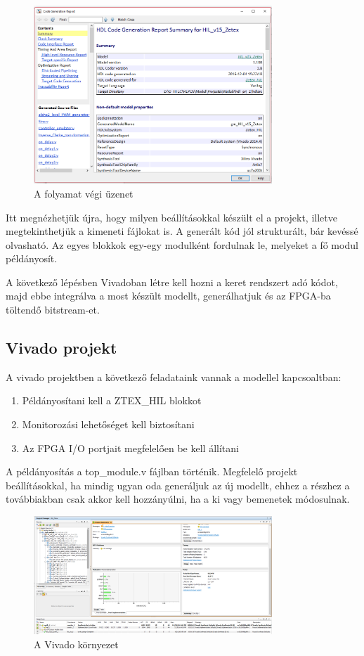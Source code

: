 \begin{figure}[h!]
	\centering
	\includegraphics[width = 0.8\textwidth]{figures/hdl_report.png}
	\caption{A folyamat végi üzenet} 
	\label{fig:hdl_report}
\end{figure}

Itt megnézhetjük újra, hogy milyen beállításokkal készült el a projekt, illetve megtekinthetjük a kimeneti fájlokat is. A generált kód jól strukturált, bár kevéssé olvasható. Az egyes blokkok egy-egy modulként fordulnak le, melyeket a fő modul példányosít.

A következő lépésben Vivadoban létre kell hozni a keret rendszert adó kódot, majd ebbe integrálva a most készült modellt, generálhatjuk és az FPGA-ba töltendő bitstream-et.

\subsection{Vivado projekt}

A vivado projektben a következő feladataink vannak a modellel kapcsoaltban:
\begin{enumerate}
	\item{Példányosítani kell a ZTEX\_HIL blokkot}
	\item{Monitorozási lehetőséget kell biztosítani}
	\item{Az FPGA I/O portjait megfelelően be kell állítani}
\end{enumerate}

A példányosítás a top\_module.v fájlban történik. Megfelelő projekt beállításokkal, ha mindig ugyan oda generáljuk az új modellt, ehhez a részhez a továbbiakban csak akkor kell hozzányúlni, ha a ki vagy bemenetek módosulnak.

\begin{figure}[H]
	\centering
	\includegraphics[width = 0.8\textwidth]{figures/vivado.png}
	\caption{A Vivado környezet} 
	\label{fig:hdl_report}
\end{figure}

